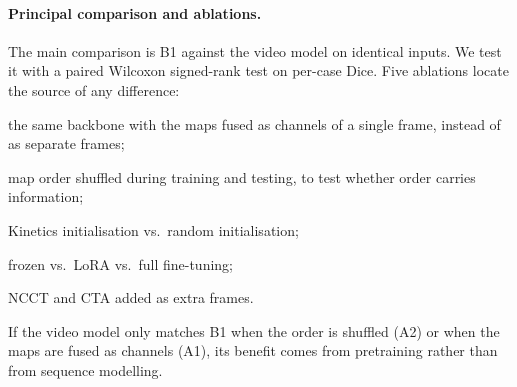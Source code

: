 \paragraph{Principal comparison and ablations.}
The main comparison is B1 against the video model on identical inputs. We test it with a paired Wilcoxon signed-rank test on per-case Dice. Five ablations locate the source of any difference:
\begin{enumerate*}[label=(A\arabic*)]
  \item the same backbone with the maps fused as channels of a single frame, instead of as separate frames;
  \item map order shuffled during training and testing, to test whether order carries information;
  \item Kinetics initialisation vs.\ random initialisation;
  \item frozen vs.\ LoRA vs.\ full fine-tuning;
  \item NCCT and CTA added as extra frames.
\end{enumerate*}
If the video model only matches B1 when the order is shuffled (A2) or when the maps are fused as channels (A1), its benefit comes from pretraining rather than from sequence modelling.
